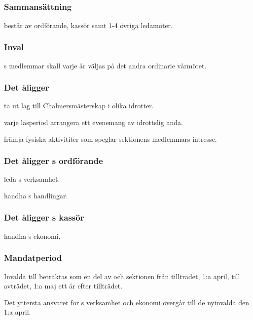 \subsection{\FRITIDFULL}
\subsubsection{Sammansättning}
\FRITID{} består av ordförande, kassör samt 1-4 övriga ledamöter.

\subsubsection{Inval}
\FRITID{}s medlemmar skall varje år väljas på det andra ordinarie vårmötet.

\subsubsection{Det åligger \FRITID}
\begin{att}
	\item ta ut lag till Chalmersmästerskap i olika idrotter.
	\item varje läsperiod arrangera ett evenemang av idrottslig anda.
	\item främja fysiska aktivititer som speglar sektionens medlemmars intresse.
\end{att}

\subsubsection{Det åligger \FRITID{}s ordförande}
\begin{att}
	\item leda \FRITID{}s verksamhet.
	\item handha \FRITID{}s handlingar.
\end{att}

\subsubsection{Det åligger \FRITID{}s kassör}
\begin{att}
	\item handha \FRITID{}s ekonomi.
\end{att}

\subsubsection{Mandatperiod}
Invalda till \FRITID{} betraktas som en del av \FRITID{} och sektionen från tillträdet, 1:a april, till avträdet, 1:a maj ett år efter tillträdet.

Det yttersta ansvaret för \FRITID{}s verksamhet och ekonomi övergår till de nyinvalda den 1:a april.